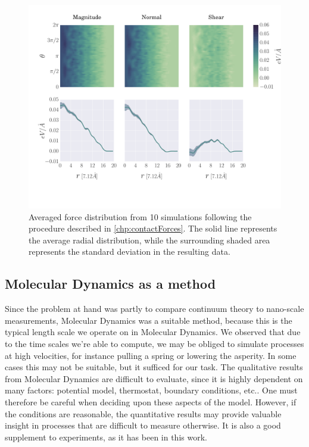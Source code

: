 \documentclass[twoside,english]{uiofysmaster}
\begin{document}
 
\begin{figure}
	\centering
	\includegraphics[width=\linewidth, trim={18mm 40mm 0mm 16mm}, clip] {figures/forceDistribution/radialDistribution/averagedDistributionsN10}
	\caption{Averaged force distribution from 10 simulations following the procedure described in \ref{chp:contactForces}. 
		The solid line represents the average radial distribution, while the surrounding shaded area represents the standard deviation in the resulting data. 
	}
	\label{fig:averagedDistributionsN10}
\end{figure}


\subsection{Molecular Dynamics as a method}
Since the problem at hand was partly to compare continuum theory to nano-scale measurements, Molecular Dynamics was a suitable method, because this is the typical length scale we operate on in Molecular Dynamics. 
We observed that due to the time scales we're able to compute, we may be obliged to simulate processes at high velocities, for instance pulling a spring or lowering the asperity. 
In some cases this may not be suitable, but it sufficed for our task.
The qualitative results from Molecular Dynamics are difficult to evaluate, since it is highly dependent on many factors: potential model, thermostat, boundary conditions, etc.. 
One must therefore be careful when deciding upon these aspects of the model. 
However, if the conditions are reasonable, the quantitative results may provide valuable insight in processes that are difficult to measure otherwise. 
It is also a good supplement to experiments, as it has been in this work.
\end{document}
